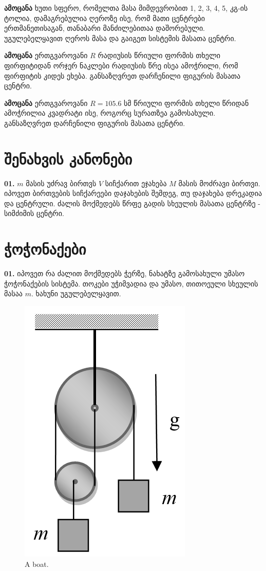 \documentclass[a4paper]{book}
\begin{document}
\textbf{ამოცანა}  ხუთი სფერო, რომელთა მასა მიმდევრობით 1, 2, 3, 4, 5, კგ-ის ტოლია, დამაგრებულია ღეროზე ისე, რომ მათი ცენტრები ერთმანეთისაგან, თანაბარი მანძილებითაა დაშორებული. უგულებელყავით ღეროს მასა და გაიგეთ სისტემის მასათა ცენტრი.

\textbf{ამოცანა} ერთგვაროვანი $R$ რადიუსის წრიული ფორმის თხელი ფირფიტიდან ორჯერ ნაკლები რადიუსის წრე ისეა ამოჭრილი, რომ ფირფიტის კიდეს ეხება. განსაზღვრეთ დარჩენილი ფიგურის მასათა ცენტრი.

\textbf{ამოცანა} ერთგვაროვანი $R = 105.6$ სმ წრიული ფორმის თხელი წრიდან ამოჭრილია კვადრატი ისე, როგორც სურათზეა გამოსახული.
განსაზღვრეთ დარჩენილი ფიგურის მასათა ცენტრი.

	\section{შენახვის კანონები}
	\textbf{01.} $m$ მასის უძრავ ბირთვს $V$ სიჩქარით ეჯახება $M$ მასის მოძრავი ბირთვი. იპოვეთ ბირთვების სიჩქარეები დაჯახების შემდეგ, თუ დაჯახება დრეკადია და ცენტრული. ძალის მოქმედებს წრფე გადის სხეულის მასათა ცენტრზე - სიმძიმის ცენტრი.
		
	\section{ჭოჭონაქები}
	\textbf{01.} იპოვეთ რა ძალით მოქმედებს ჭერზე, ნახატზე გამოსახული უმასო ჭოჭონაქების სისტემა. თოკები უჭიმვადია და უმასო,  თითოეული სხეულის მასაა $m$.  ხახუნი უგულებელყავით.
	 			\begin{figure}[H]
	 			\centering
           \includegraphics[width=0.2\columnwidth]{figures/03}
           \caption{A boat.}
           \label{fig:wowonaqi}
        \end{figure}
\end{document}
